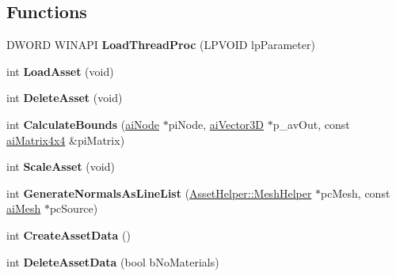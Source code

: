 \subsection*{Functions}
\begin{DoxyCompactItemize}
\item 
\hypertarget{namespace_assimp_view_a0b3ff1296514c5efc3a0a1cce5b6b0c6}{D\+W\+O\+R\+D W\+I\+N\+A\+P\+I {\bfseries Load\+Thread\+Proc} (L\+P\+V\+O\+I\+D lp\+Parameter)}\label{namespace_assimp_view_a0b3ff1296514c5efc3a0a1cce5b6b0c6}

\item 
\hypertarget{namespace_assimp_view_a0dcdd36d3efaf133afdeb1c8171aa99c}{int {\bfseries Load\+Asset} (void)}\label{namespace_assimp_view_a0dcdd36d3efaf133afdeb1c8171aa99c}

\item 
\hypertarget{namespace_assimp_view_a4bd378f5325df17ceee06bc5306590f9}{int {\bfseries Delete\+Asset} (void)}\label{namespace_assimp_view_a4bd378f5325df17ceee06bc5306590f9}

\item 
\hypertarget{namespace_assimp_view_aab249358c3cd02c77bf7fceee5d366eb}{int {\bfseries Calculate\+Bounds} (\hyperlink{structai_node}{ai\+Node} $\ast$pi\+Node, \hyperlink{structai_vector3_d}{ai\+Vector3\+D} $\ast$p\+\_\+av\+Out, const \hyperlink{structai_matrix4x4}{ai\+Matrix4x4} \&pi\+Matrix)}\label{namespace_assimp_view_aab249358c3cd02c77bf7fceee5d366eb}

\item 
\hypertarget{namespace_assimp_view_a79d3473b78ae8c67ac6c174ff9142e56}{int {\bfseries Scale\+Asset} (void)}\label{namespace_assimp_view_a79d3473b78ae8c67ac6c174ff9142e56}

\item 
\hypertarget{namespace_assimp_view_aefe581eadd1ee130050c34a8cd12fe92}{int {\bfseries Generate\+Normals\+As\+Line\+List} (\hyperlink{class_asset_helper_1_1_mesh_helper}{Asset\+Helper\+::\+Mesh\+Helper} $\ast$pc\+Mesh, const \hyperlink{structai_mesh}{ai\+Mesh} $\ast$pc\+Source)}\label{namespace_assimp_view_aefe581eadd1ee130050c34a8cd12fe92}

\item 
\hypertarget{namespace_assimp_view_a3e4c2972743eec479f0cd70c392bb5cd}{int {\bfseries Create\+Asset\+Data} ()}\label{namespace_assimp_view_a3e4c2972743eec479f0cd70c392bb5cd}

\item 
\hypertarget{namespace_assimp_view_ab0ff0585af4fd7bc9cc997d921c3dd35}{int {\bfseries Delete\+Asset\+Data} (bool b\+No\+Materials)}\label{namespace_assimp_view_ab0ff0585af4fd7bc9cc997d921c3dd35}


\end{DoxyCompactItemize}
